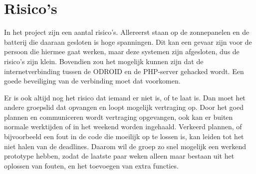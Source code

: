 \section{Risico's}
In het project zijn een aantal risico's. Allereerst staan op de zonnepanelen en de batterij die daaraan gesloten is hoge spanningen. Dit kan een gevaar zijn voor de persoon die hiermee gaat werken, maar deze systemen zijn afgesloten, dus de risico's zijn klein.
Bovendien zou het mogelijk kunnen zijn dat de internetverbinding tussen de ODROID en de PHP-server gehacked wordt. Een goede beveiliging van de verbinding moet dat voorkomen.

Er is ook altijd nog het risico dat iemand er niet is, of te laat is. Dan moet het andere groepslid dat opvangen en loopt mogelijk vertraging op. Door het goed plannen en communiceren wordt vertraging opgevangen, ook kan er buiten normale werktijden of in het weekend worden ingehaald. Verkeerd plannen, of bijvoorbeeld een fout in de code die moeilijk op te lossen is, kan leiden tot het niet halen van de deadlines. Daarom wil de groep zo snel mogelijk een werkend prototype hebben, zodat de laatste paar weken alleen maar bestaan uit het oplossen van fouten, en het toevoegen van extra functies.
